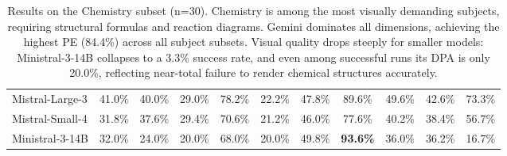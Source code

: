 \documentclass[11pt]{article}
\begin{document}
\begin{table}[!ht]
{\begin{tabular}{lcccc|cccc|cc}
Mistral-Large-3        & 41.0\% & 40.0\% & 29.0\% & 78.2\% & 22.2\% & 47.8\% & 89.6\% & 49.6\% & 42.6\% & 73.3\% \\
Mistral-Small-4        & 31.8\% & 37.6\% & 29.4\% & 70.6\% & 21.2\% & 46.0\% & 77.6\% & 40.2\% & 38.4\% & 56.7\% \\
Ministral-3-14B        & 32.0\% & 24.0\% & 20.0\% & 68.0\% & 20.0\% & 49.8\% & \textbf{93.6\%} & 36.0\% & 36.2\% & 16.7\% \\
\bottomrule
\end{tabular}}
\caption{Results on the Chemistry subset (n=30). Chemistry is among the most visually demanding subjects, requiring structural formulas and reaction diagrams. Gemini dominates all dimensions, achieving the highest PE (84.4\%) across all subject subsets. Visual quality drops steeply for smaller models: Ministral-3-14B collapses to a 3.3\% success rate, and even among successful runs its DPA is only 20.0\%, reflecting near-total failure to render chemical structures accurately.}
\label{tab:results-chemistry}
\end{table}
\end{document}
